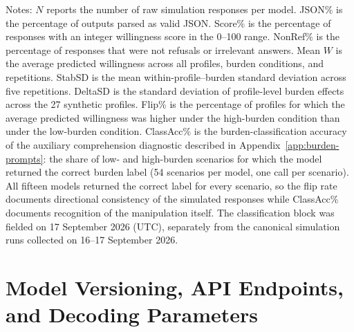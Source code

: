 \documentclass[11pt]{article}
\begin{document}
\begin{table}[htbp]
\begin{flushleft}
\footnotesize Notes: $N$ reports the number of raw simulation responses per model. JSON\% is the percentage of outputs parsed as valid JSON. Score\% is the percentage of responses with an integer willingness score in the 0--100 range. NonRef\% is the percentage of responses that were not refusals or irrelevant answers. Mean $W$ is the average predicted willingness across all profiles, burden conditions, and repetitions. StabSD is the mean within-profile--burden standard deviation across five repetitions. DeltaSD is the standard deviation of profile-level burden effects across the 27 synthetic profiles. Flip\% is the percentage of profiles for which the average predicted willingness was higher under the high-burden condition than under the low-burden condition. ClassAcc\% is the burden-classification accuracy of the auxiliary comprehension diagnostic described in Appendix~\ref{app:burden-prompts}: the share of low- and high-burden scenarios for which the model returned the correct burden label (54 scenarios per model, one call per scenario). All fifteen models returned the correct label for every scenario, so the flip rate documents directional consistency of the simulated responses while ClassAcc\% documents recognition of the manipulation itself. The classification block was fielded on 17 September 2026 (UTC), separately from the canonical simulation runs collected on 16--17 September 2026.
\end{flushleft}
\end{table}

\clearpage   %

\clearpage   %
\section{Model Versioning, API Endpoints, and Decoding Parameters}
\label{app:models}
\end{document}
